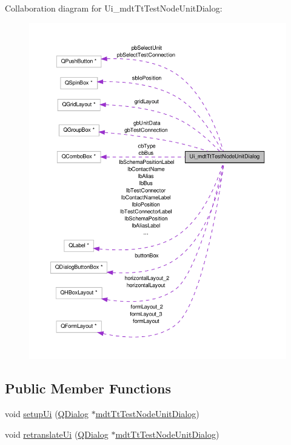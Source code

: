 Collaboration diagram for Ui\-\_\-mdt\-Tt\-Test\-Node\-Unit\-Dialog\-:\nopagebreak
\begin{figure}[H]
\begin{center}
\leavevmode
\includegraphics[width=350pt]{class_ui__mdt_tt_test_node_unit_dialog__coll__graph}
\end{center}
\end{figure}
\subsection*{Public Member Functions}
\begin{DoxyCompactItemize}
\item 
void \hyperlink{class_ui__mdt_tt_test_node_unit_dialog_aa7e31748ea8c6e43fcc5365200263c70}{setup\-Ui} (\hyperlink{class_q_dialog}{Q\-Dialog} $\ast$\hyperlink{classmdt_tt_test_node_unit_dialog}{mdt\-Tt\-Test\-Node\-Unit\-Dialog})
\item 
void \hyperlink{class_ui__mdt_tt_test_node_unit_dialog_a7b0de318445b64271ebc2835055e0fab}{retranslate\-Ui} (\hyperlink{class_q_dialog}{Q\-Dialog} $\ast$\hyperlink{classmdt_tt_test_node_unit_dialog}{mdt\-Tt\-Test\-Node\-Unit\-Dialog})
\end{DoxyCompactItemize}
